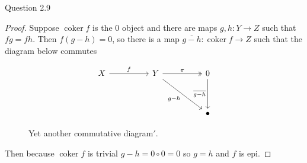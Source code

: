 \documentclass{article}
\DeclareMathOperator{\coker}{coker}
\newenvironment{question}[1][]{\begin{paragraph}{Question #1}}{\end{paragraph}}
\theoremstyle{definition}
\begin{document}
\begin{question}[2.9]
\begin{enumerate}[a)]
\begin{proof}
                  Suppose \(\coker f\) is the \(0\) object and there are maps
                  \(g,h:Y\to Z\) such that \(fg=fh\). Then \(f(g-h)=0\), so
                  there is a map \(\overline{g-h}:\coker f\to Z\) such that the
                  diagram below commutes
                  \begin{figure}[H]
                      \[
                          \begin{tikzcd}
                              X && Y && 0 \\
                              \\
                              &&&& \bullet
                              \arrow["f", from=1-1, to=1-3]
                              \arrow["{g-h}"', from=1-3, to=3-5]
                              \arrow["{\overline{g-h}}"', from=1-5, to=3-5]
                              \arrow["\pi", two heads, from=1-3, to=1-5]
                          \end{tikzcd}
                      \]
                      \caption{Yet another commutative diagram\('\).}
                      \label{fig:cokernel-0-f-epi}
                  \end{figure}
                  Then because \(\coker f\) is trivial \(g-h=0\circ0=0\) so
                  \(g=h\) and \(f\) is epi.
              \end{proof}
    \end{enumerate}
\end{question}
\end{document}
